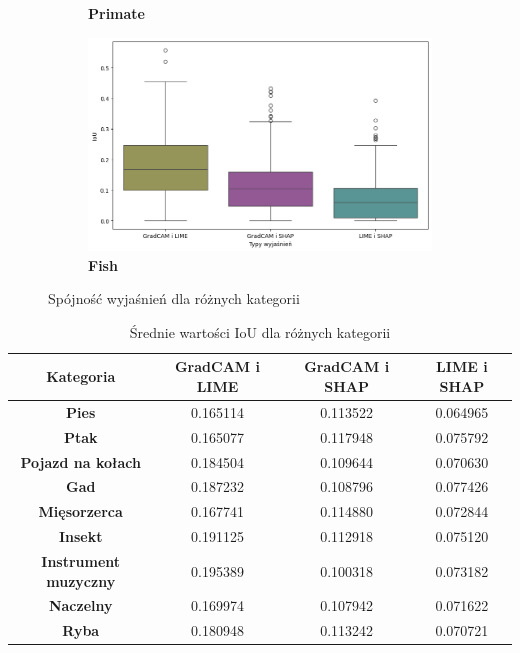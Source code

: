 \begin{figure}[h]
\begin{subfigure}[b]{0.3\textwidth}
		\caption{\textbf{Primate}}  \label{}
	\end{subfigure}
	\begin{subfigure}[b]{0.3\textwidth}
		\centering\includegraphics[width=.9\textwidth]{img/base_coherence_fish}
		\caption{\textbf{Fish}}  \label{}
	\end{subfigure}
	\caption{Spójność wyjaśnień dla różnych kategorii}
	\label{rys:coherence_category}
\end{figure}

\begin{table}[h]
	\centering
	\begin{tabular}{|c|c|c|c|}
		\hline
		\textbf{Kategoria}           & \textbf{GradCAM i LIME} & \textbf{GradCAM i SHAP} & \textbf{LIME i SHAP} \\
		\hline
		\textbf{Pies}                & 0.165114                & 0.113522                & 0.064965             \\
		\hline
		\textbf{Ptak}                & 0.165077                & 0.117948                & 0.075792             \\
		\hline
		\textbf{Pojazd na kołach}    & 0.184504                & 0.109644                & 0.070630             \\
		\hline
		\textbf{Gad}                 & 0.187232                & 0.108796                & 0.077426             \\
		\hline
		\textbf{Mięsorzerca}         & 0.167741                & 0.114880                & 0.072844             \\
		\hline
		\textbf{Insekt}              & 0.191125                & 0.112918                & 0.075120             \\
		\hline
		\textbf{Instrument muzyczny} & 0.195389                & 0.100318                & 0.073182             \\
		\hline
		\textbf{Naczelny}            & 0.169974                & 0.107942                & 0.071622             \\
		\hline
		\textbf{Ryba}                & 0.180948                & 0.113242                & 0.070721             \\
		\hline
	\end{tabular}
	\caption{Średnie wartości IoU dla różnych kategorii}
	\label{tab:base_coherence_categories}
\end{table}

